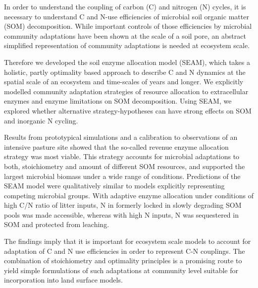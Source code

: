 In order to understand the coupling of carbon (C) and nitrogen (N) cycles, it is
necessary to understand C and N-use efficiencies of microbial soil organic
matter (SOM) decomposition. While important controls of those efficiencies by
microbial community adaptations have been shown at the scale of a soil pore, an
abstract simplified representation of community adaptations is needed at
ecosystem scale.

Therefore we developed the soil enzyme allocation model (SEAM), which takes a
holistic, partly optimality based approach to describe C and N dynamics at the
spatial scale of an ecosystem and time-scales of years and longer. We explicitly
modelled community adaptation strategies of resource allocation to extracellular
enzymes and enzyme limitations on SOM decomposition. Using SEAM, we explored
whether alternative strategy-hypotheses can have strong effects on SOM and
inorganic N cycling.

Results from prototypical simulations and a calibration to observations of an
intensive pasture site showed that the so-called revenue enzyme allocation
strategy was most viable. This strategy accounts for microbial adaptations to
both, stoichiometry and amount of different SOM resources, and supported the
largest microbial biomass under a wide range of conditions. Predictions of the
SEAM model were qualitatively similar to models explicitly representing
competing microbial groups. With adaptive enzyme allocation under conditions of
high C/N ratio of litter inputs, N in formerly locked in slowly degrading SOM
pools was made accessible, whereas with high N inputs, N was sequestered in
SOM and protected from leaching.

The findings imply that it is important for ecosystem scale models to account
for adaptation of C and N use efficiencies in order to represent C-N couplings.
The combination of stoichiometry and optimality principles is a promising route
to yield simple formulations of such adaptations at community level suitable for
incorporation into land surface models.
